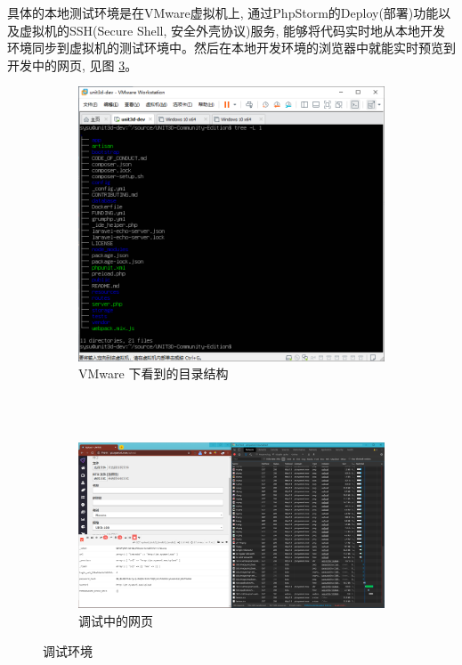 
具体的本地测试环境是在VMware虚拟机上, 通过PhpStorm的Deploy(部署)功能以及虚拟机的SSH(Secure Shell, 安全外壳协议)服务, 能够将代码实时地从本地开发环境同步到虚拟机的测试环境中。然后在本地开发环境的浏览器中就能实时预览到开发中的网页, 见图 \ref{fig:devenv}。

\begin{figure}[h]
	\centering
    \begin{subfigure}{0.8\textwidth}
		\centering
		\includegraphics[width=\textwidth]{support-files/4.1-vwmare-unit3d-dev.png}
		\caption{VMware 下看到的目录结构}
		\label{fig:vmware}
	\end{subfigure} \\
    \vbox{}
    　\\
    \vbox{}
    \begin{subfigure}{0.8\textwidth}
		\centering
		\includegraphics[width=\textwidth]{support-files/4.1-web-idehelper-chrome-devtool.png}
		\caption{调试中的网页}
		\label{fig:chromedevtool}
	\end{subfigure} 
    \caption{调试环境}
	\label{fig:devenv}
\end{figure}

